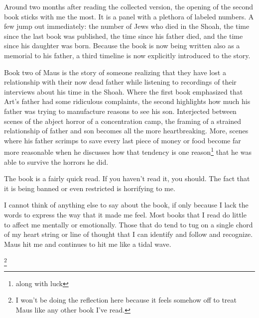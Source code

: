 \documentclass[12pt]{article}[titlepage]
\newcommand{\1}{\={a}}
\newcommand{\2}{\={e}}
\newcommand{\3}{\={\i}}
\newcommand{\4}{\=o}
\newcommand{\5}{\=u}
\newcommand{\6}{\={A}}
\renewcommand{\,}{\textsuperscript{,}}
\begin{document}
Around two months after reading the collected version, the opening of the second book sticks with me the most.
It is a panel with a plethora of labeled numbers.
A few jump out immediately: the number of Jews who died in the Shoah, the time since the last book was published, the time since his father died, and the time since his daughter was born.
Because the book is now being written also as a memorial to his father, a third timeline is now explicitly introduced to the story.

Book two of Maus is the story of someone realizing that they have lost a relationship with their now dead father while listening to recordings of their interviews about his time in the Shoah.
Where the first book emphasized that Art's father had some ridiculous complaints, the second highlights how much his father was trying to manufacture reasons to see his son.
Interjected between scenes of the abject horror of a concentration camp, the framing of a strained relationship of father and son becomes all the more heartbreaking.
More, scenes where his father scrimps to save every last piece of money or food become far more reasonable when he discusses how that tendency is one reason\footnote{along with luck} that he was able to survive the horrors he did.

The book is a fairly quick read.
If you haven't read it, you should.
The fact that it is being banned or even restricted is horrifying to me.

I cannot think of anything else to say about the book, if only because I lack the words to express the way that it made me feel.
Most books that I read do little to affect me mentally or emotionally.
Those that do tend to tug on a single chord of my heart string or line of thought that I can identify and follow and recognize.
Maus hit me and continues to hit me like a tidal wave.

\footnote{I won't be doing the reflection here because it feels somehow off to treat Maus like any other book I've read.}
\end{document}

